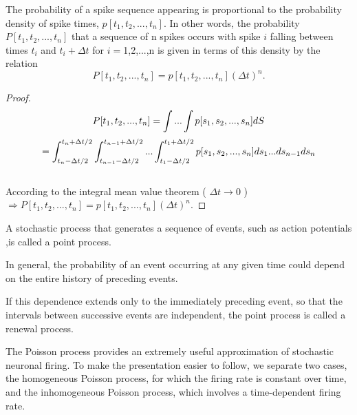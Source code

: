\begin{thm}
    The probability of a spike sequence appearing is proportional to the probability density of spike times,  $p[t_1, t_2, ..., t_n]$. In other words, the probability $P[t_1,t_2,...,t_n]$ that a sequence of n spikes occurs with spike $i$ falling between times $t_i$ and $t_i+\Delta t$ for $i= $1,2,...,n is given in terms of this density by the relation 
    \begin{equation}
        P[t_1,t_2,...,t_n]=p[t_1,t_2,...,t_n](\Delta t)^n.        
    \end{equation}
    \begin{proof}
        \small
        $$P[t_1,t_2,...,t_n]=\int... \int p[s_1,s_2,...,s_n]dS\\$$
        $$=\int^{t_n+\Delta t/2}_{t_n-\Delta t/2} 
        \int^{t_{n-1}+\Delta t/2}_{t_{n-1}-\Delta t/2} ...\int^{t_1+\Delta t/2}_{t_1-\Delta t/2} p[s_1,s_2,...,s_n]ds_1 ...ds_{n-1}ds_{n}\\$$
  \\ According to the integral mean value theorem ( $\Delta t \to 0  $ )\\
        $\Rightarrow  P[t_1,t_2,...,t_n]=p[t_1,t_2,...,t_n](\Delta t)^n.        $
        
    \end{proof}
\end{thm}

\begin{defn}
    A stochastic process that generates a sequence of events, such as action potentials ,is called a point process.     
\end{defn}

\begin{rem}
    In general, the probability of an event occurring at any given time could depend on the entire history of preceding events. 
\end{rem}

\begin{defn}
    If this dependence extends only to the immediately preceding event, so that the intervals between successive events are independent, the point process is called a renewal process.
\end{defn}

\begin{defn}
    The Poisson process provides an extremely useful approximation of stochastic neuronal firing.
    To make the presentation easier to follow, we separate two cases, the homogeneous Poisson process, for which the firing rate is constant over time, and the inhomogeneous Poisson process, which involves a time-dependent firing rate.
\end{defn}

